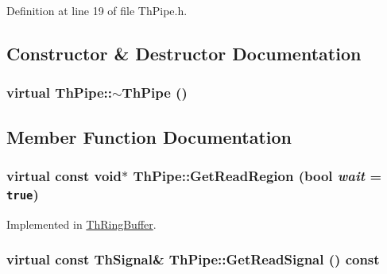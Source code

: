 Definition at line 19 of file ThPipe.h.

\subsection{Constructor \& Destructor Documentation}
\hypertarget{class_th_pipe_e1d8c4c4e5a7cf49e7f9ddc2cc2e3d7c}{
\subsubsection[{$\sim$ThPipe}]{\setlength{\rightskip}{0pt plus 5cm}virtual ThPipe::$\sim$ThPipe ()}}
\label{class_th_pipe_e1d8c4c4e5a7cf49e7f9ddc2cc2e3d7c}




\subsection{Member Function Documentation}
\hypertarget{class_th_pipe_543d5b9358cb2c06517f78d8a6d8ad17}{
\subsubsection[{GetReadRegion}]{\setlength{\rightskip}{0pt plus 5cm}virtual const void$\ast$ ThPipe::GetReadRegion (bool {\em wait} = {\tt true})}}
\label{class_th_pipe_543d5b9358cb2c06517f78d8a6d8ad17}




Implemented in \hyperlink{class_th_ring_buffer_9a183e067d41605a1c376a84f4dbf4b2}{ThRingBuffer}.\hypertarget{class_th_pipe_32dfa60adbe180b619ee5f99826ef39b}{
\subsubsection[{GetReadSignal}]{\setlength{\rightskip}{0pt plus 5cm}virtual const {\bf ThSignal}\& ThPipe::GetReadSignal () const}}
\label{class_th_pipe_32dfa60adbe180b619ee5f99826ef39b}




